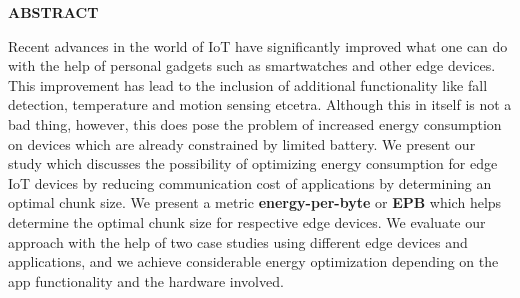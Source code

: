 {}
\begin{center}
    \textbf{ABSTRACT} 
\end{center}

Recent advances in the world of IoT have significantly improved what one 
can do with the help of personal gadgets such as smartwatches and other 
edge devices. This improvement has lead to the inclusion of additional 
functionality like fall detection, temperature and motion sensing etcetra. 
Although this in itself is not a bad thing, however, this does pose the 
problem of increased energy consumption on devices which are already 
constrained by limited battery. We present our study which discusses the 
possibility of optimizing energy consumption for edge IoT devices by reducing 
communication cost of applications by determining an optimal chunk size. We 
present a metric \textbf{energy-per-byte} or \textbf{EPB} which helps determine 
the optimal chunk size for respective edge devices. We evaluate our approach 
with the help of two case studies using different edge devices and applications, 
and we achieve considerable energy optimization depending on the app functionality 
and the hardware involved.